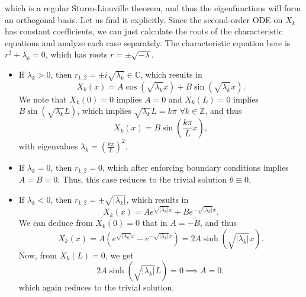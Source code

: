 which is a regular Sturm-Liouville theorem, and thus the eigenfunctions will form an orthogonal basis. Let us find it explicitly. Since the second-order ODE on $X_k$ has constant coefficients, we can just calculate the roots of the characteristic equations and analyze each case separately. The characteristic equation here is $r^2+\lambda_k=0$, which has roots $r=\pm \sqrt{-\lambda}$.
\begin{itemize}
    \item If $\lambda_k>0$, then $r_{1,2} = \pm i \sqrt{\lambda_k}\in\mathbb C$, which results in
    \begin{equation*}
        X_k(x) = A\cos(\sqrt{\lambda_k}x) + B\sin(\sqrt{\lambda_k}x).
    \end{equation*} 
    We note that $X_k(0)=0$ implies $A=0$ and $X_k(L)=0$ implies $B\sin(\sqrt{\lambda_k}L)$, which implies $\sqrt{\lambda_k}L = k\pi$ $\forall k\in\mathbb Z$, and thus 
    \begin{equation*}
        X_k(x) = B\sin\left(\frac{k\pi}{L}x\right),
    \end{equation*}
    with eigenvalues $\lambda_k = \left(\frac{k\pi}{L}\right)^2$. 
    \item If $\lambda_k = 0$, then $r_{1,2} = 0$, which after enforcing boundary conditions implies $A = B = 0$. Thus, this case reduces to the trivial solution $\theta\equiv 0$. 
    \item If $\lambda_k<0$, then $r_{1,2} = \pm\sqrt{|\lambda_k|}$, which results in 
    \begin{equation*}
        X_k(x) = Ae^{\sqrt{|\lambda_k|}x} + B e^{-\sqrt{|\lambda_k|}x}.
    \end{equation*}
    We can deduce from $X_k(0)=0$ that  in $A=-B$, and thus 
    \begin{equation*}
        X_k(x) = A\left(e^{\sqrt{|\lambda_k|}x} -e^{-\sqrt{|\lambda_k|}x}\right) = 2A\sinh(\sqrt{|\lambda_k|}x).
    \end{equation*}
    Now, from $X_k(L)=0$, we get 
    \begin{equation*}
        2A\sinh(\sqrt{|\lambda_k|}L) = 0 \implies A = 0,
    \end{equation*}
    which again reduces to the trivial solution. 
\end{itemize}

